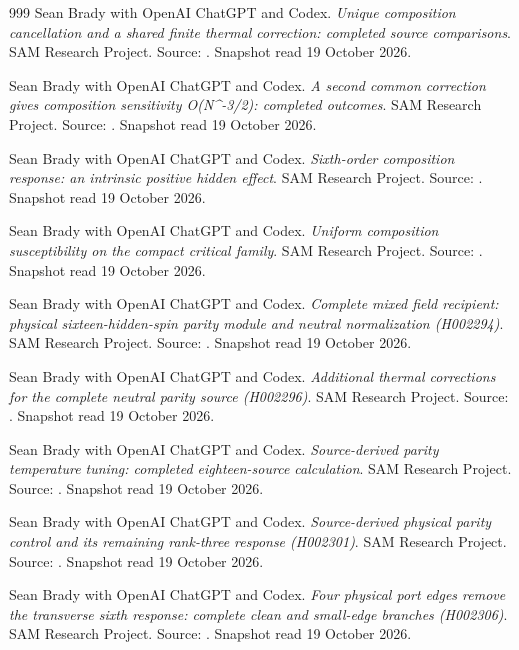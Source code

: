 \begin{thebibliography}{999}
 Sean Brady with OpenAI ChatGPT and Codex. \emph{Unique composition cancellation and a shared finite thermal correction: completed source comparisons}. SAM Research Project. Source: . Snapshot read 19 October 2026.

 Sean Brady with OpenAI ChatGPT and Codex. \emph{A second common correction gives composition sensitivity O(N\textasciicircum{}-3/2): completed outcomes}. SAM Research Project. Source: . Snapshot read 19 October 2026.

 Sean Brady with OpenAI ChatGPT and Codex. \emph{Sixth-order composition response: an intrinsic positive hidden effect}. SAM Research Project. Source: . Snapshot read 19 October 2026.

 Sean Brady with OpenAI ChatGPT and Codex. \emph{Uniform composition susceptibility on the compact critical family}. SAM Research Project. Source: . Snapshot read 19 October 2026.

 Sean Brady with OpenAI ChatGPT and Codex. \emph{Complete mixed field recipient: physical sixteen-hidden-spin parity module and neutral normalization (H002294)}. SAM Research Project. Source: . Snapshot read 19 October 2026.

 Sean Brady with OpenAI ChatGPT and Codex. \emph{Additional thermal corrections for the complete neutral parity source (H002296)}. SAM Research Project. Source: . Snapshot read 19 October 2026.

 Sean Brady with OpenAI ChatGPT and Codex. \emph{Source-derived parity temperature tuning: completed eighteen-source calculation}. SAM Research Project. Source: . Snapshot read 19 October 2026.

 Sean Brady with OpenAI ChatGPT and Codex. \emph{Source-derived physical parity control and its remaining rank-three response (H002301)}. SAM Research Project. Source: . Snapshot read 19 October 2026.

 Sean Brady with OpenAI ChatGPT and Codex. \emph{Four physical port edges remove the transverse sixth response: complete clean and small-edge branches (H002306)}. SAM Research Project. Source: . Snapshot read 19 October 2026.


\end{thebibliography}

